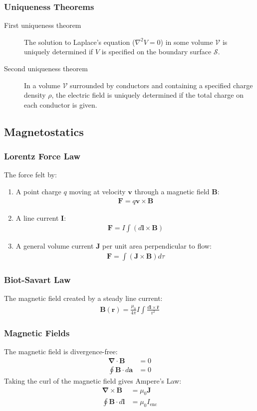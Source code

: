 \documentclass[11pt]{article}
\newcommand{\ve}[1]{
  \ensuremath{\bm{#1}}}	               %
\newcommand{\dr}{
  \ensuremath{\text{r}}}               %
\newcommand{\dvr}{
  \ensuremath{\textbf{r}}}             %
\newcommand{\dvrhat}{
  \ensuremath{\ve{\hat{\dvr}}}}	       %
\begin{document}
\begin{multicols*}{3}
\subsubsection{Uniqueness Theorems}
\begin{description}
\item[First uniqueness theorem] The solution to Laplace's equation ($\nabla^2V=0$) in some volume $\mathcal{V}$ is uniquely determined if $V$ is specified on the boundary surface $\mathcal{S}$. 
\item[Second uniqueness theorem] In a volume $\mathcal{V}$ surrounded by conductors and containing a specified charge density $\rho$, the electric field is uniquely determined if the total charge on each conductor is given. 
\end{description}
\subsection{Magnetostatics}
\subsubsection{Lorentz Force Law}
The force felt by:
\begin{enumerate}
\item A point charge $q$ moving at velocity $\ve{v}$ through a magnetic field $\ve{B}$:
\begin{align*}
\ve{F}=q\ve{v}\times\ve{B}
\end{align*}
\item A line current $\ve{I}$:
\begin{align*}
\ve{F}=I\int(d\ve{l}\times\ve{B})
\end{align*}
\item A general volume current $\ve{J}$ per unit area perpendicular to flow:
\begin{align*}
\ve{F}=\int(\ve{J}\times\ve{B})d\tau
\end{align*}
 \end{enumerate}
\subsubsection{Biot-Savart Law}
The magnetic field created by a steady line current:
\begin{align*}
\ve{B}(\ve{r})= \frac{\mu_0}{4\pi}I\int\frac{d\ve{l}\times\dvrhat}{\dr^2}
\end{align*}
\subsubsection{Magnetic Fields}
The magnetic field is divergence-free:
\begin{align*}
\ve{\nabla}\cdot\ve{B}&=0\\
\oint\ve{B}\cdot d\ve{a}&=0
\end{align*}
Taking the curl of the magnetic field gives Ampere's Law:
\begin{align*}
\ve{\nabla}\times\ve{B}&=\mu_0\ve{J}\\
\oint\ve{B}\cdot d\ve{l}&=\mu_0 I_{\text{enc}}
\end{align*}

\end{multicols*}
\end{document}
